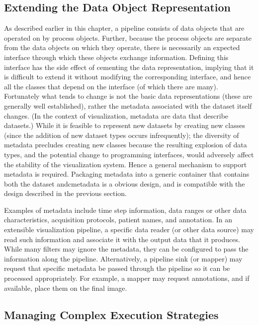 \subsection{Extending the Data Object Representation}
\label{subsec:extending_data_object_representation}

As described earlier in this chapter, a pipeline consists of data objects that are operated on by process objects. Further, because the process objects are separate from the data objects on which they operate, there is necessarily an expected interface through which these objects exchange information. Defining this interface has the side effect of cementing the data representation, implying that it is difficult to extend it without modifying the corresponding interface, and hence all the classes that depend on the interface (of which there are many). Fortunately what tends to change is not the basic data representations (these are generally well established), rather the metadata associated with the dataset itself changes. (In the context of visualization, metadata are data that describe datasets.) While it is feasible to represent new datasets by creating new classes (since the addition of new dataset types occurs infrequently); the diversity of metadata precludes creating new classes because the resulting explosion of data types, and the potential change to programming interfaces, would adversely affect the stability of the visualization system. Hence a general mechanism to support metadata is required. Packaging metadata into a generic container that contains both the dataset andcmetadata is a obvious design, and is compatible with the design described in the previous section.

Examples of metadata include time step information, data ranges or other data characteristics, acquisition protocols, patient names, and annotation. In an extensible visualization pipeline, a specific data reader (or other data source) may read such information and associate it with the output data that it produces. While many filters may ignore the metadata, they can be configured to pass the information along the pipeline. Alternatively, a pipeline sink (or mapper) may request that specific metadata be passed through the pipeline so it can be processed appropriately. For example, a mapper may request annotations, and if available, place them on the final image.

\subsection{Managing Complex Execution Strategies}
\label{subsec:managing_complex_execution_strategies}

